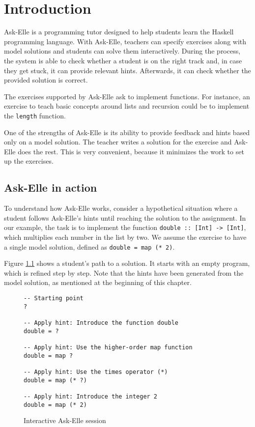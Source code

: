 \chapter{Introduction}
\label{sec:intro}

Ask-Elle \cite{2017askelle} is a programming tutor designed to help students learn the Haskell programming language. With Ask-Elle, teachers can specify exercises along with model solutions and students can solve them interactively. During the process, the system is able to check whether a student is on the right track and, in case they get stuck, it can provide relevant hints. Afterwards, it can check whether the provided solution is correct.

The exercises supported by Ask-Elle ask to implement functions. For instance, an exercise to teach basic concepts around lists and recursion could be to implement the \texttt{length} function.

One of the strengths of Ask-Elle is its ability to provide feedback and hints based only on a model solution. The teacher writes a solution for the exercise and Ask-Elle does the rest. This is very convenient, because it minimizes the work to set up the exercises.

\section{Ask-Elle in action}
\label{sec:intro-askelle-example-session}

To understand how Ask-Elle works, consider a hypothetical situation where a student follows Ask-Elle's hints until reaching the solution to the assignment. In our example, the task is to implement the function \texttt{double :: [Int] -> [Int]}, which multiplies each number in the list by two. We assume the exercise to have a single model solution, defined as \texttt{double = map (* 2)}.

Figure \ref{fig:interactive-session-double} shows a student's path to a solution. It starts with an empty program, which is refined step by step. Note that the hints have been generated from the model solution, as mentioned at the beginning of this chapter.

\begin{figure}
\begin{verbatim}
-- Starting point
?

-- Apply hint: Introduce the function double
double = ?

-- Apply hint: Use the higher-order map function
double = map ?

-- Apply hint: Use the times operator (*)
double = map (* ?)

-- Apply hint: Introduce the integer 2
double = map (* 2)
\end{verbatim}
\caption{Interactive Ask-Elle session}
\label{fig:interactive-session-double}
\end{figure}

